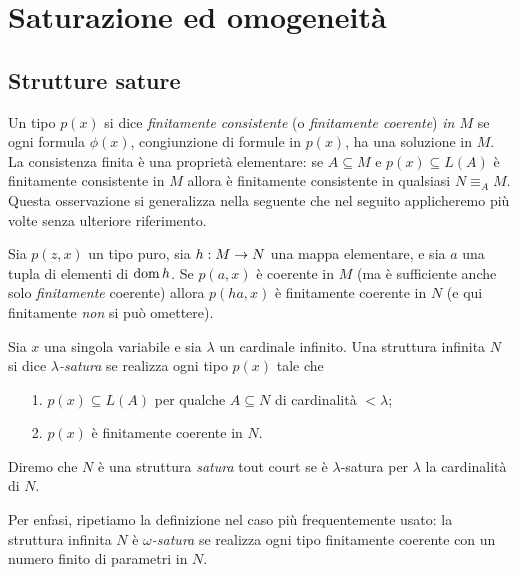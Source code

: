 \chapter{Saturazione ed omogeneit\`a}
\label{saturazione}
 
\def\ceq#1#2#3{\parbox{20ex}{$\displaystyle #1$}\parbox{6ex}{\hfil$\displaystyle #2$}$\displaystyle  #3$}

\section{Strutture sature}

Un tipo $p(x)$ si dice \emph{finitamente consistente\/} (o \emph{finitamente coerente\/}) \emph{in $M$\/} se ogni formula $\phi(x)$, congiunzione di formule in $p(x)$, ha una soluzione in $M$. La consistenza finita \`e una propriet\`a elementare: se $A\subseteq M$ e $p(x)\subseteq L(A)$ \`e finitamente consistente in $M$ allora \`e finitamente consistente in qualsiasi $N\equiv_A M$. Questa osservazione si generalizza nella seguente che nel seguito applicheremo pi\`u volte senza ulteriore riferimento.

\begin{remark}\label{fincoermappaelem}
Sia $p(z,x)$ un tipo puro, sia $h:M\rightarrow N$ una mappa elementare, e sia $a$ una tupla di elementi di $\mathop{\rm dom} h$. Se $p(a,x)$ \`e coerente in $M$ (ma \`e sufficiente anche solo \textit{finitamente\/} coerente) allora $p(ha,x)$ \`e finitamente coerente in $N$ (e qui finitamente \textit{non\/} si pu\`o omettere).\QED
\end{remark}

\begin{definition}
Sia $x$ una singola variabile e sia $\lambda$ un cardinale infinito. Una struttura infinita $N$ si dice \emph{$\lambda$-satura} se realizza ogni tipo $p(x)$ tale che
\begin{itemize}
\item[1.] $p(x)\subseteq L(A)$ per qualche $A\subseteq N$ di cardinalit\`a $<\lambda$;
\item[2.] $p(x)$ \`e finitamente coerente in $N$.
\end{itemize}
Diremo che $N$ \`e una struttura \emph{satura\/} tout court se \`e $\lambda$-satura per $\lambda$ la cardinalit\`a di $N$.
\end{definition}

Per enfasi, ripetiamo la definizione nel caso pi\`u frequentemente usato: la struttura infinita $N$ \`e \emph{$\omega$-satura} se realizza ogni tipo finitamente coerente con un numero finito di parametri in $N$. 

